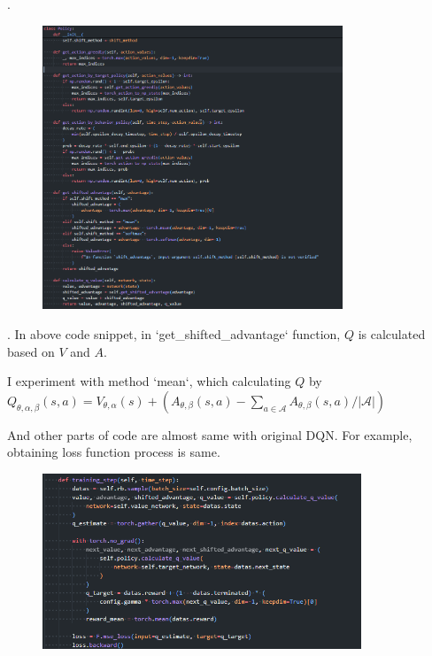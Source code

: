 \documentclass[8pt]{beamer}
\newcommand{\mc}[1]{\mathcal{#1}}
\newcommand{\abs}[1]{\left\lvert #1 \right\rvert}
\begin{document}
\begin{frame}{.}
    \begin{figure}
        \includegraphics[width=0.8\textwidth]{DuelingDQNPolicyCode.png}
    \end{figure}
\end{frame}

\begin{frame}{.}
    In above code snippet, in `get\_shifted\_advantage` function, $Q$ is calculated based on $V$ and $A$.

    I experiment with method `mean`, which calculating $Q$ by
    $Q_{\theta, \alpha, \beta}(s,a) = V_{\theta, \alpha}(s) + (A_{\theta, \beta}(s,a) - \sum_{a \in \mc{A}} A_{\theta, \beta}(s,a)/\abs{\mc{A}})$

    And other parts of code are almost same with original DQN. For example, obtaining loss function process is same.

    \begin{figure}
        \includegraphics[width=0.85\textwidth]{DuelingDQNLoss.png}
    \end{figure}
\end{frame}
\end{document}
